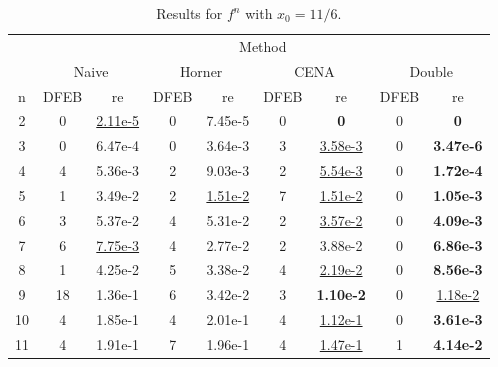 \documentclass{standalone}
\begin{document}
	\begin{table}
	\centering
	\begin{tabular*}{\textwidth}{ccccccccc}\toprule
	& \multicolumn{8}{c}{Method}\\
	\cmidrule{2-9}
	& \multicolumn{2}{P{3cm}}{Naive} & \multicolumn{2}{P{3cm}}{Horner} & \multicolumn{2}{P{3cm}}{CENA} & \multicolumn{2}{P{3cm}}{Double}\\
	\multicolumn{1}{P{0.73cm}}{n} & \multicolumn{1}{P{1.50cm}}{DFEB} & \multicolumn{1}{P{1.50cm}}{re} & \multicolumn{1}{P{1.50cm}}{DFEB} & \multicolumn{1}{P{1.50cm}}{re} & \multicolumn{1}{P{1.50cm}}{DFEB} & \multicolumn{1}{P{1.50cm}}{re} & \multicolumn{1}{P{1.50cm}}{DFEB} & \multicolumn{1}{P{1.50cm}}{re} \\
	\midrule
	 2 &  0 & \underline{2.11e-5} & 0 & 7.45e-5 & 0 & \textbf{0} & 0 & \textbf{0} \\
	 3 &  0 & 6.47e-4 & 0 & 3.64e-3 & 3 & \underline{3.58e-3} & 0 &  \textbf{3.47e-6} \\
	 4 &  4 & 5.36e-3 & 2 & 9.03e-3 & 2 & \underline{5.54e-3} & 0 &  \textbf{1.72e-4} \\
	 5 &  1 & 3.49e-2 & 2 & \underline{1.51e-2} & 7 & \underline{1.51e-2} & 0 &  \textbf{1.05e-3} \\
	 6 &  3 & 5.37e-2 & 4 & 5.31e-2 & 2 & \underline{3.57e-2} & 0 &  \textbf{4.09e-3} \\
	 7 &  6 & \underline{7.75e-3} & 4 & 2.77e-2 & 2 & 3.88e-2 & 0 & \textbf{6.86e-3} \\
	 8 &  1 & 4.25e-2 & 5 & 3.38e-2 & 4 & \underline{2.19e-2} & 0 & \textbf{8.56e-3} \\
	 9 & 18 & 1.36e-1 & 6 & 3.42e-2 & 3 & \textbf{1.10e-2} & 0 & \underline{1.18e-2} \\
	10 &  4 & 1.85e-1 & 4 & 2.01e-1 & 4 & \underline{1.12e-1} & 0 & \textbf{3.61e-3} \\
	11 &  4 & 1.91e-1 & 7 & 1.96e-1 & 4 & \underline{1.47e-1} & 1 & \textbf{4.14e-2}
	\end{tabular*}
	\caption{Results for $f^{n}$ with $x_{0}=11/6$.}\label{tab:2}
	\end{table}
	\clearpage
\end{document}
